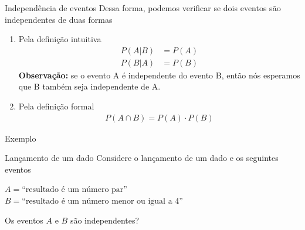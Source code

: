 \documentclass[10pt]{beamer}\usepackage[]{graphicx}\usepackage[]{color}
\theoremstyle{definition}
\begin{document}
\begin{frame}{Independência de eventos}
  Dessa forma, podemos verificar se dois eventos são independentes de
  duas formas
  \begin{enumerate}
  \item Pela definição intuitiva
    \begin{align*}
      P(A|B) &= P(A) \\
      P(B|A) &= P(B)
    \end{align*}
    \textbf{Observação:} se o evento A é independente do evento B, então
    nós esperamos que B também seja independente de A.
  \item Pela definição formal
    \begin{align*}
      P(A \cap B) = P(A) \cdot P(B)
    \end{align*}
  \end{enumerate}
\end{frame}

\begin{frame}[fragile]{Exemplo}
  \begin{block}{Lançamento de um dado}
    Considere o lançamento de um dado e os seguintes eventos
    \begin{center}
      $A = \text{``resultado é um número par''}$\\
      $B = \text{``resultado é um número menor ou igual a 4''}$
    \end{center}
    Os eventos $A$ e $B$ são independentes?
  \end{block}
  \begin{center}
  \end{center}
\end{frame}
\end{document}
